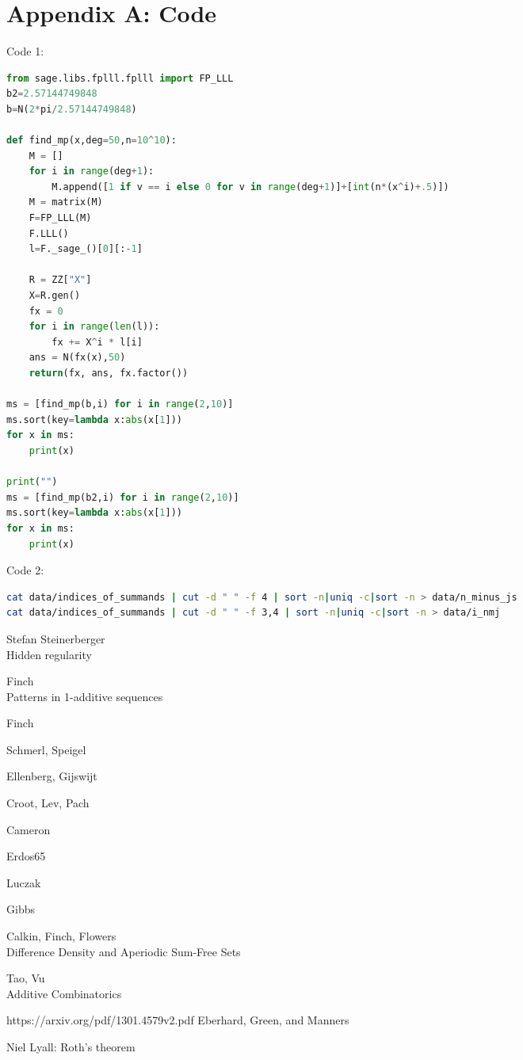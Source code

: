 \documentclass{article}
\theoremstyle{definition}
\theoremstyle{remark}
\numberwithin{equation}{section}
\begin{document}
\section{Appendix A: Code}

Code 1: 

\begin{lstlisting}[language=Python]% {../lll.py}
from sage.libs.fplll.fplll import FP_LLL
b2=2.57144749848
b=N(2*pi/2.57144749848)

def find_mp(x,deg=50,n=10^10):
    M = []
    for i in range(deg+1):
        M.append([1 if v == i else 0 for v in range(deg+1)]+[int(n*(x^i)+.5)])
    M = matrix(M)
    F=FP_LLL(M)
    F.LLL()
    l=F._sage_()[0][:-1]

    R = ZZ["X"]
    X=R.gen()
    fx = 0
    for i in range(len(l)):
        fx += X^i * l[i]
    ans = N(fx(x),50)
    return(fx, ans, fx.factor())

ms = [find_mp(b,i) for i in range(2,10)]
ms.sort(key=lambda x:abs(x[1]))
for x in ms:
    print(x)

print("")
ms = [find_mp(b2,i) for i in range(2,10)]
ms.sort(key=lambda x:abs(x[1]))
for x in ms:
    print(x)
\end{lstlisting}

Code 2: 

\begin{lstlisting}[language=Bash]
cat data/indices_of_summands | cut -d " " -f 4 | sort -n|uniq -c|sort -n > data/n_minus_js
cat data/indices_of_summands | cut -d " " -f 3,4 | sort -n|uniq -c|sort -n > data/i_nmj
\end{lstlisting}

\begin{thebibliography}{9}
Stefan Steinerberger\\
Hidden regularity

Finch\\
Patterns in 1-additive sequences
 
Finch
 
Schmerl, Speigel
 
Ellenberg, Gijswijt

Croot, Lev, Pach

Cameron

Erdos65

Luczak

Gibbs

Calkin, Finch, Flowers\\
Difference Density and Aperiodic Sum-Free Sets 

Tao, Vu\\
Additive Combinatorics

  https://arxiv.org/pdf/1301.4579v2.pdf Eberhard, Green, and Manners

  Niel Lyall: Roth's theorem 

\end{thebibliography}
\end{document}
